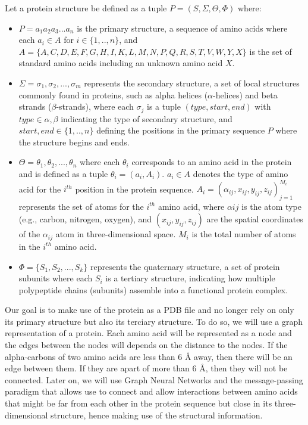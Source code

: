 Let a protein structure be defined as a tuple $P = (S, \Sigma, \Theta, \Phi)$ where:


\begin{itemize}
  \item $P=a_1a_2a_3...a_n$ is the primary structure, a sequence of amino acids where each 
  $a_i \in A$ for $i \in \{1,..,n\}$, and $A=\{A,C,D,E,F,G,H,I,K,L,M,N,P,Q,R,S,T,V,W,Y,X\}$ is the set of 
  standard amino acids including an unknown amino acid $X$.
  \item $\Sigma = {\sigma_1, \sigma_2, ..., \sigma_m}$ represents the secondary structure, a set of 
  local structures commonly found in proteins, such as alpha helices ($\alpha$-helices) and 
  beta strands ($\beta$-strands), where each $\sigma_j$ is a tuple $(type, start, end)$ 
  with $type \in {\alpha, \beta}$ indicating the type of secondary structure, and $start, end \in \{1,..,n\}$ 
  defining the positions in the primary sequence $P$ where the structure begins and ends.
  \item $\Theta = {\theta_1, \theta_2, ..., \theta_n}$ where each $\theta_i$ corresponds to an amino acid 
  in the protein and is defined as a tuple $\theta_i = (a_i, A_i)$. $a_i \in A$ denotes the type of amino acid for 
  the $i^{th}$ position in the protein sequence. $A_i = {(\alpha_{ij}, x_{ij}, y_{ij}, z_{ij})}_{j=1}^{M_i}$ 
  represents the set of atoms for the $i^{th}$ amino acid, where $\alpha{ij}$ is the atom type 
  (e.g., carbon, nitrogen, oxygen), and $(x_{ij}, y_{ij}, z_{ij})$ are the spatial coordinates of 
  the $\alpha_{ij}$ atom in three-dimensional space. $M_i$ is the total number of atoms 
  in the $i^{th}$ amino acid.
  \item $\Phi = \{S_1, S_2, ..., S_k\}$ represents the quaternary structure, a set of protein subunits where 
  each $S_i$ is a tertiary structure, indicating how multiple polypeptide chains (subunits) 
  assemble into a functional protein complex.
\end{itemize}

Our goal is to make use of the protein as a PDB file and no longer rely on only its primary structure but 
also its terciary structure. To do so, we will use a graph representation of a protein. Each amino acid will
be represented as a node and the edges between the nodes will depends on the distance to the nodes. If the
alpha-carbons of two amino acids are less than 6 {\AA} away, then there will be an edge between them. 
If they are apart of more than 6 {\AA}, then they will not be connected. Later on, we will use Graph Neural Networks
and the message-passing paradigm that allows use to connect and allow interactions between amino acids that
might be far from each other in the protein sequence but close in its three-dimensional structure, hence making 
use of the structural information.

